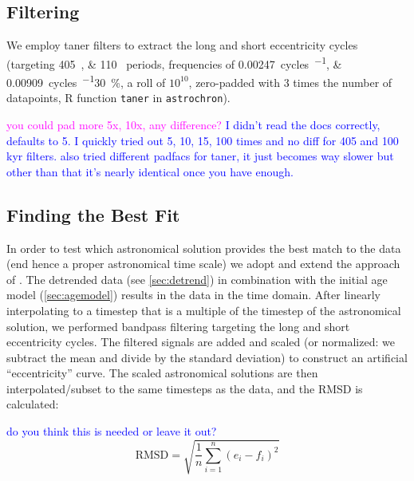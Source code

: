\documentclass[draft]{agujournal2019}
\newcommand{\rez}{\textcolor{magenta}}
\newcommand{\ijk}{\textcolor{blue}}
\begin{document}
\subsection{Filtering}\label{sec:spectral}


We employ taner filters to extract the long and short eccentricity cycles
(targeting \qtylist{405;110}{\kiloyear} periods,
frequencies of \qtylist{0.00247;0.00909}{cycles\per\kiloyear}\textpm\qty{30}{\percent},
a roll of \(10^{10}\),
zero-padded with 3 times the number of datapoints,
R function \texttt{taner} in \texttt{astrochron}).

\rez{you could pad more 5x, 10x, any difference?}
\ijk{I didn't read the docs correctly, defaults to 5. I quickly tried out 5, 10, 15, 100 times and no diff for 405 and 100 kyr filters.}
\ijk{also tried different padfacs for taner, it just becomes way slower but other than that it's nearly identical once you have enough.}

\subsection{Finding the Best Fit}\label{sec:algorithm}

In order to test which astronomical solution provides the best match to the data (end hence a proper astronomical time scale) we adopt and extend the approach of .
The detrended data (see \cref{sec:detrend}) in combination with the initial age model (\cref{sec:agemodel}) results in the data in the time domain.
After linearly interpolating to a timestep that is a multiple of the timestep of the astronomical solution, we performed bandpass filtering targeting the long and short eccentricity cycles.
The filtered signals are added and scaled (or normalized: we subtract the mean and divide by the standard deviation) to construct an artificial ``eccentricity'' curve.
The scaled astronomical solutions are then interpolated/subset to the same timesteps as the data, and the \gls{RMSD} is calculated:

\ijk{do you think this is needed or leave it out?}
\begin{equation}
    \text{RMSD} = \sqrt{\frac{1}{n}\sum_{i=1}^{n}(e_{i} - f_{i})^{2}}
\end{equation}
\end{document}
